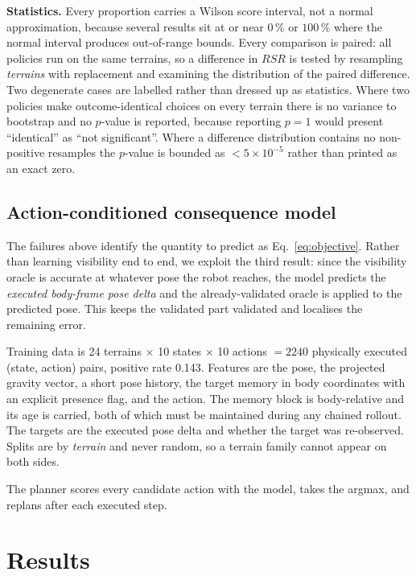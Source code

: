 \documentclass[utf8]{FrontiersinHarvard}
\begin{document}
\textbf{Statistics.} Every proportion carries a Wilson score interval, not a normal
approximation, because several results sit at or near $0\,\%$ or $100\,\%$ where the
normal interval produces out-of-range bounds. Every comparison is paired: all policies
run on the same terrains, so a difference in $RSR$ is tested by resampling
\emph{terrains} with replacement and examining the distribution of the paired
difference. Two degenerate cases are labelled rather than dressed up as statistics.
Where two policies make outcome-identical choices on every terrain there is no variance
to bootstrap and no $p$-value is reported, because reporting $p=1$ would present
``identical'' as ``not significant''. Where a difference distribution contains no
non-positive resamples the $p$-value is bounded as $<5\times10^{-5}$ rather than printed
as an exact zero.

\subsection{Action-conditioned consequence model}

The failures above identify the quantity to predict as Eq.~\ref{eq:objective}. Rather
than learning visibility end to end, we exploit the third result: since the visibility
oracle is accurate at whatever pose the robot reaches, the model predicts the
\emph{executed body-frame pose delta} and the already-validated oracle is applied to the
predicted pose. This keeps the validated part validated and localises the remaining
error.

Training data is 24 terrains $\times$ 10 states $\times$ 10 actions $= 2240$ physically
executed (state, action) pairs, positive rate 0.143. Features are the pose, the
projected gravity vector, a short pose history, the target memory in body coordinates
with an explicit presence flag, and the action. The memory block is body-relative and
its age is carried, both of which must be maintained during any chained rollout. The
targets are the executed pose delta and whether the target was re-observed. Splits are
by \emph{terrain} and never random, so a terrain family cannot appear on both sides.

The planner scores every candidate action with the model, takes the argmax, and
replans after each executed step.

\section{Results}
\end{document}
